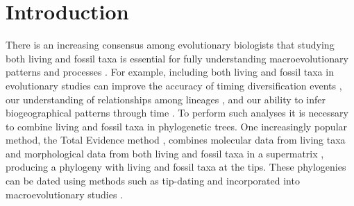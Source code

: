 \newpage

%
%
\newpage 
\section{Introduction}
There is an increasing consensus among evolutionary biologists that studying both living and fossil taxa is essential for fully understanding macroevolutionary patterns and processes \citep{slaterunifying2013,fritzdiversity2013,Wood01032013}.
For example, including both living and fossil taxa in evolutionary studies can improve the accuracy of timing diversification events \citep[e.g.][]{ronquista2012}, our understanding of relationships among lineages \citep[e.g.][]{beckancient2014}, and our ability to infer biogeographical patterns through time \citep[e.g.][]{Meseguer01032015}.
To perform such analyses it is necessary to combine living and fossil taxa in phylogenetic trees.
One increasingly popular method, the Total Evidence method \citep{eernissetaxonomic1993,ronquista2012}, combines molecular data from living taxa and morphological data from both living and fossil taxa in a supermatrix \citep[e.g.][]{pyrondivergence2011,ronquista2012,schragocombining2013,slaterunifying2013,beckancient2014,Meseguer01032015}, producing a phylogeny with living and fossil taxa at the tips. 
These phylogenies can be dated using methods such as tip-dating \citep{ronquista2012,Wood01032013} and incorporated into macroevolutionary studies \citep[e.g.][]{ronquista2012,Wood01032013,slaterphylogenetic2013}.


